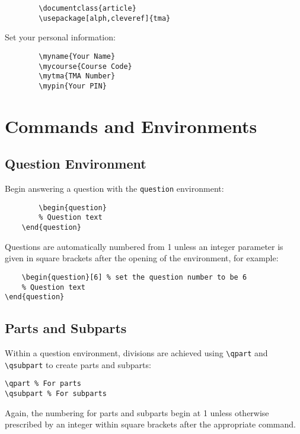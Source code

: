 \documentclass[twoside]{article}
\begin{document}
	\begin{verbatim}
		\documentclass{article}
		\usepackage[alph,cleveref]{tma}
	\end{verbatim}
	
	Set your personal information:
	
	\begin{verbatim}
		\myname{Your Name}
		\mycourse{Course Code}
		\mytma{TMA Number}
		\mypin{Your PIN}
	\end{verbatim}
	
	\section{Commands and Environments}
	
	\subsection{Question Environment}
	
	Begin answering a question with the \texttt{question} environment:
	
	\begin{verbatim}
		\begin{question}
		% Question text
	\end{question}
\end{verbatim}

Questions are automatically numbered from 1 unless an integer parameter is given in square brackets after the opening of the environment, for example:

\begin{verbatim}
	\begin{question}[6] % set the question number to be 6
	% Question text
\end{question}
\end{verbatim}

\subsection{Parts and Subparts}

Within a question environment, divisions are achieved using \verb|\qpart| and \verb|\qsubpart| to create parts and subparts:

\begin{verbatim}
\qpart % For parts
\qsubpart % For subparts
\end{verbatim}

Again, the numbering for parts and subparts begin at 1 unless otherwise prescribed by an integer within square brackets after the appropriate command.
\end{document}
